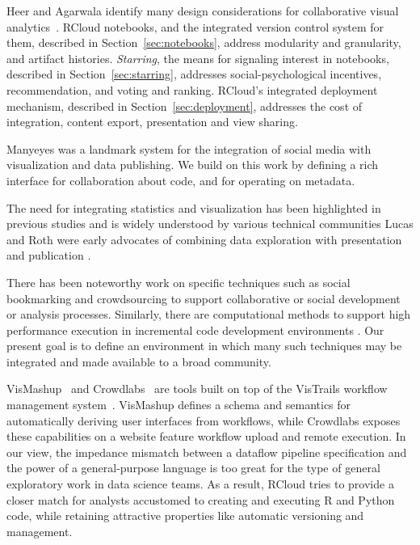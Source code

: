 Heer and Agarwala identify many design considerations for
collaborative visual analytics~\cite{Heer:2008:DCF}.
RCloud notebooks, and the integrated version control system for them,
described in Section~\ref{sec:notebooks}, address modularity and granularity,
and artifact histories.
\emph{Starring}, the means for signaling interest in notebooks, described in
Section~\ref{sec:starring}, addresses social-psychological incentives,
recommendation, and voting and ranking. RCloud's integrated deployment
mechanism, described in Section~\ref{sec:deployment}, addresses the cost of
integration, content export, presentation and view sharing.

Manyeyes \cite{Viegas:2007:MAS} was a landmark system for the integration
of social media with visualization and data publishing. We build on this
work by defining a rich interface for collaboration about code, and for
operating on metadata.

The need for integrating statistics and visualization has been
highlighted in previous studies and is widely understood by
various technical communities \cite{Perer:2008:ISA}
Lucas and Roth were early advocates of combining
data exploration with presentation and publication \cite{Lucas:1996:EIV}.

There has been noteworthy work on specific techniques such as
social bookmarking \cite{Millen:2006:DSB} \cite{Heer:2007:VAV}
and crowdsourcing \cite{Fast:2014:ECS} to support collaborative
or social development or analysis processes.
Similarly, there are computational methods to support high
performance execution in incremental code development
environments \cite{Guo:2010:TPI}.
Our present goal is to define an environment in which many such
techniques may be integrated and made available to a broad community.

VisMashup~\cite{Santos:2009:VST} and Crowdlabs~\cite{Mates:2011:CSA}
are tools built on top of the VisTrails workflow management
system~\cite{Callahan:2006:VVM}. VisMashup defines a schema and
semantics for automatically deriving user interfaces from workflows,
while Crowdlabs exposes these capabilities on a website feature
workflow upload and remote execution. In our view, the impedance
mismatch between a dataflow pipeline specification and the power of a
general-purpose language is too great for the type of general
exploratory work in data science teams. As a result, RCloud tries to
provide a closer match for analysts accustomed to creating and
executing R and Python code, while retaining attractive
properties like automatic versioning and management.

